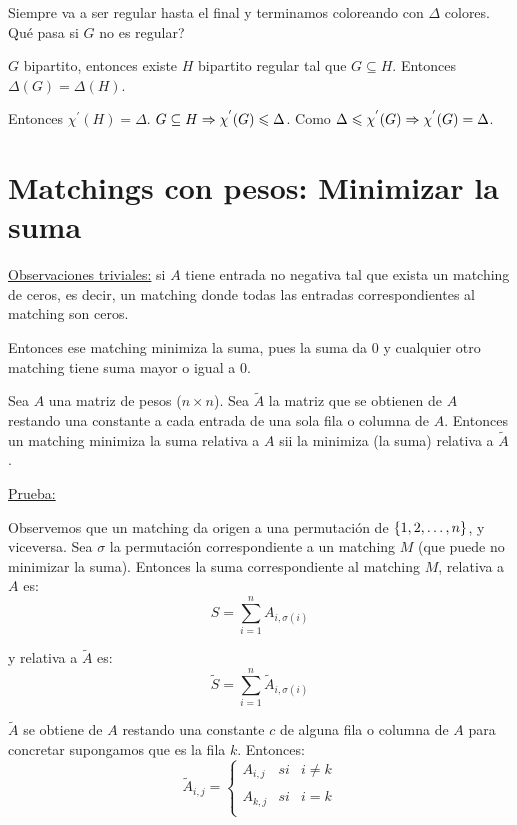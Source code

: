 \documentclass[12pt,a4paper]{article}
\begin{document}
Siempre va a ser regular hasta el final y terminamos coloreando con $\Delta$ colores. 
Qué pasa si $G$ no es regular?

\begin{lema} $G$ bipartito, entonces existe $H$ bipartito regular tal que 
    $G \subseteq H$. Entonces $\Delta(G) = \Delta(H)$.
\end{lema}

Entonces $\chi^{'}(H) = \Delta$. $G \subseteq H \Rightarrow \chi^{'}(G) \leqslant \Delta$. 
Como $\Delta \leqslant \chi^{'}(G) \Rightarrow \chi^{'}(G) = \Delta$.

\section{Matchings con pesos: Minimizar la suma}

\underline{Observaciones triviales:} si $A$ tiene entrada no negativa tal que 
exista un matching de ceros, es decir, un matching donde todas las entradas correspondientes 
al matching son ceros.
\medskip

Entonces ese matching minimiza la suma, pues la suma da $0$ y cualquier otro matching 
tiene suma mayor o igual a $0$.

\begin{lema} Sea $A$ una matriz de pesos ($n\times n$). Sea $\widetilde{A}$ la matriz 
    que se obtienen de $A$ restando una constante a cada entrada de una sola fila o 
    columna de $A$. Entonces un matching minimiza la suma relativa a $A$ sii la 
    minimiza (la suma) relativa a $\widetilde{A}$.
\end{lema}
\underline{Prueba:}
\medskip

Observemos que un matching da origen a una permutación de $\left\lbrace 1,2,\dots,n \right\rbrace$, y 
viceversa. Sea $\sigma$ la permutación correspondiente a un matching $M$ 
(que puede no minimizar la suma). Entonces la suma correspondiente al matching $M$, 
relativa a $A$ es:
$$S = \sum_{i=1}^{n} A_{i,\sigma(i)}$$

y relativa a $\widetilde{A}$ es:
$$\widetilde{S} = \sum_{i=1}^{n} \widetilde{A}_{i,\sigma(i)}$$

$\widetilde{A}$ se obtiene de $A$ restando una constante $c$ de alguna fila o columna 
de $A$ para concretar supongamos que es la fila $k$. Entonces:
$$\widetilde{A}_{i,j}= \left\{ \begin{array}{lcc}
    A_{i,j} & si & i \neq k\\
    \\ A_{k,j} & si & i = k\\
    \end{array}
    \right.$$
\end{document}
